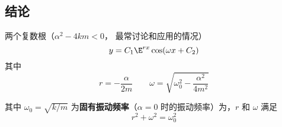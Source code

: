 
\subsection{结论}
两个复数根（${\alpha ^2} - 4km < 0$， 最常讨论和应用的情况）
\begin{equation}
y = {C_1}{\E^{rx}}\cos(\omega x + C_2)
\end{equation}
其中
\begin{equation}
r =  - \frac{\alpha }{2m} \qquad  \omega  = \sqrt {\omega _0^2 - \frac{\alpha ^2}{4{m^2}}}
\end{equation}

其中 ${\omega _0} = \sqrt{k/m}$ 为\textbf{固有振动频率}（$\alpha  = 0$ 时的振动频率）为，$r$ 和 $\omega$ 满足
\begin{equation}
{r^2} + {\omega ^2} = \omega _0^2
\end{equation}

